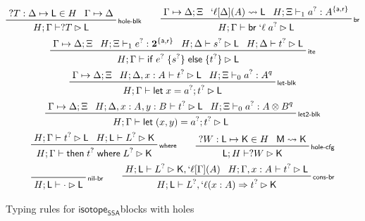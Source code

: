 \documentclass[acmsmall,screen,review]{acmart}
\newcommand{\mb}[1]{\ensuremath{\mathbf{#1}}}
\newcommand{\ms}[1]{\ensuremath{\mathsf{#1}}}
\newcommand{\lbl}[1]{{`#1}}
\newcommand{\lto}{\Rightarrow}
\newcommand{\letstmt}[3]{\ensuremath{\ms{let}\;#1 = #2; #3}}
\newcommand{\brb}[2]{\ms{br}\;#1\;#2}
\newcommand{\lbrb}[2]{\brb{\lbl{#1}}{#2}}
\newcommand{\ite}[3]{\ms{if}\;#1\;\{#2\}\;\ms{else}\;\{#3\}}
\newcommand{\ewhere}[2]{\ms{then}\;#1\;\ms{where}\;#2}
\newcommand{\wbranch}[3]{#1(#2) \lto #3}
\newcommand{\lwbranch}[3]{\wbranch{\lbl{#1}}{#2}{#3}}
\newcommand{\csplits}[3]{#1 \mapsto #2;#3}
\newcommand{\cwk}[2]{#1 \mapsto #2}
\newcommand{\lwk}[2]{#1 \rightsquigarrow #2}
\newcommand{\thyp}[3]{#1: {#2}^{#3}}
\newcommand{\lhyp}[3]{#1[#2](#3)}
\newcommand{\llhyp}[3]{\lhyp{\lbl{#1}}{#2}{#3}}
\newcommand{\rle}[1]{{\scriptsize\textsf{#1}}}
\newcommand{\tint}{{\{\ms{a}, \ms{r}\}}}
\newcommand{\mhole}[1]{{#1}^?}
\newcommand{\lhole}[1]{?#1}
\newcommand{\mhasty}[6]{#1;#2 \vdash_{#3} #4: {#5}^{#6}}
\newcommand{\mhaslb}[4]{#1;#2 \vdash #3 \rhd #4}
\newcommand{\mlhaslb}[4]{#1;#2 \vdash #3 \rhd #4}
\newcommand{\blkhole}[3]{#1: #2 \mapsto #3}
\newcommand{\cfghole}[3]{#1: #2 \mapsto #3}
\newcommand{\isotopessa}{\ms{isotope_{SSA}}}
\begin{document}
\begin{figure}
  \begin{gather*}    
    \prftree[r]{\rle{hole-blk}}
      {\blkhole{\lhole{T}}{\Delta}{\ms{L}} \in H}
      {\cwk{\Gamma}{\Delta}}
      {\mhaslb{H}{\Gamma}{\lhole{T}}{\ms{L}}} 
      \qquad
    \prftree[r]{\rle{br}}
      {\csplits{\Gamma}{\Delta}{\Xi}}
      {\lwk{\llhyp{\ell}{\Delta}{A}}{\ms{L}}}
      {\mhasty{H}{\Xi}{1}{\mhole{a}}{A}{\tint}}
      {\mhaslb{H}{\Gamma}{\lbrb{\ell}{\mhole{a}}}{\ms{L}}} 
      \\
    \prftree[r]{\rle{ite}}
      {\csplits{\Gamma}{\Delta}{\Xi}}
      {\mhasty{H}{\Xi}{1}{\mhole{e}}{\mb{2}}{\tint}}
      {\mhaslb{H}{\Delta}{\mhole{s}}{\ms{L}}}
      {\mhaslb{H}{\Delta}{\mhole{t}}{\ms{L}}}
      {\mhaslb{H}{\Gamma}{\ite{\mhole{e}}{\mhole{s}}{\mhole{t}}}{\ms{L}}} \\
    \prftree[r]{\rle{let-blk}}
      {\csplits{\Gamma}{\Delta}{\Xi}}
      {\mhaslb{H}{\Delta, \thyp{x}{A}{}}{\mhole{t}}{\ms{L}}}
      {\mhasty{H}{\Xi}{0}{\mhole{a}}{A}{q}}
      {\mhaslb{H}{\Gamma}{\letstmt{x}{\mhole{a}}{\mhole{t}}}{\ms{L}}} \\
    \prftree[r]{\rle{let2-blk}}
      {\csplits{\Gamma}{\Delta}{\Xi}}
      {\mhaslb{H}{\Delta, \thyp{x}{A}{}, \thyp{y}{B}{}}{\mhole{t}}{\ms{L}}}
      {\mhasty{H}{\Xi}{0}{\mhole{a}}{A \otimes B}{q}}
      {\mhaslb{H}{\Gamma}{\letstmt{(x, y)}{\mhole{a}}{\mhole{t}}}{\ms{L}}} \\
    \prftree[r]{\rle{where}}
      {\mhaslb{H}{\Gamma}{\mhole{t}}{\ms{L}}}
      {\mlhaslb{H}{\ms{L}}{\mhole{L}}{\ms{K}}}
      {\mhaslb{H}{\Gamma}{\ewhere{\mhole{t}}{\mhole{L}}}{\ms{K}}} 
      \qquad
    \prftree[r]{\rle{hole-cfg}}
      {\cfghole{\lhole{W}}{\ms{L}}{\ms{K}} \in H}
      {\lwk{\ms{M}}{\ms{K}}}
      {\mlhaslb{\ms{L}}{H}{\lhole{W}}{\ms{K}}}
      \\
    \prftree[r]{\rle{nil-br}}
      {\mlhaslb{H}{\ms{L}}{\cdot}{\ms{L}}} \qquad
    \prftree[r]{\rle{cons-br}}
      {\mlhaslb{H}{\ms{L}}{\mhole{L}}{\ms{K}, \llhyp{\ell}{\Gamma}{A}}}
      {\mhaslb{H}{\Gamma, \thyp{x}{A}{}}{\mhole{t}}{\ms{L}}}
      {\mlhaslb{H}{\ms{L}}{\mhole{L}, \lwbranch{\ell}{x: A}{\mhole{t}}}{\ms{K}}}
  \end{gather*}
  \caption{Typing rules for \isotopessa blocks with holes}
  \label{fig:ssa-block-holes-typing}
\end{figure}
\end{document}
